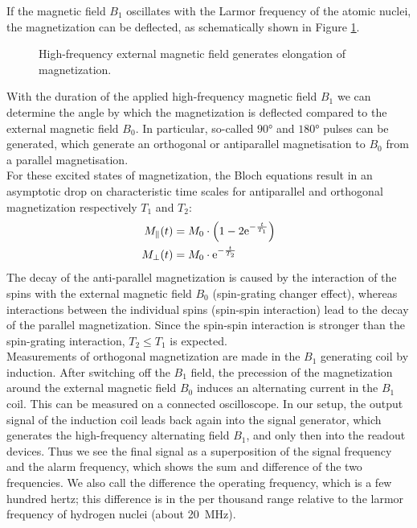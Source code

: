 If the magnetic field $B_1$ oscillates with the Larmor frequency of the atomic nuclei, the magnetization can be deflected, as schematically shown in Figure \ref{fig:magnet}.
\begin{figure}[ht]
\centering

\caption{High-frequency external magnetic field generates elongation of magnetization.}
\label{fig:magnet}
\end{figure}
With the duration of the applied high-frequency magnetic field $B_1$ we can determine the angle by which the magnetization is deflected compared to the external magnetic field $B_0$.
In particular, so-called $\ang{90}$ and $\ang{180}$ pulses can be generated, which generate an orthogonal or antiparallel magnetisation to $B_0$ from a parallel magnetisation.\\

For these excited states of magnetization, the Bloch equations result in an asymptotic drop on characteristic time scales for antiparallel and orthogonal magnetization respectively $T_1$ and $T_2$:
\begin{align}
M_\parallel(t)&=M_0\cdot\left(1-2\mathrm{e}^{-\frac{t}{T_1}}\right)\\
M_\bot(t)&=M_0\cdot\mathrm{e}^{-\frac{t}{T_2}}
\end{align}
The decay of the anti-parallel magnetization is caused by the interaction of the spins with the external magnetic field $B_0$ (spin-grating changer effect), whereas interactions between the individual spins (spin-spin interaction) lead to the decay of the parallel magnetization.
Since the spin-spin interaction is stronger than the spin-grating interaction, $T_2\leq T_1$ is expected.\\
Measurements of orthogonal magnetization are made in the $B_1$ generating coil by induction.
After switching off the $B_1$ field, the precession of the magnetization around the external magnetic field $B_0$ induces an alternating current in the $B_1$ coil.
This can be measured on a connected oscilloscope.
In our setup, the output signal of the induction coil leads back again into the signal generator, which generates the high-frequency alternating field $B_1$, and only then into the readout devices.
Thus we see the final signal as a superposition of the signal frequency and the alarm frequency, which shows the sum and difference of the two frequencies.
We also call the difference the operating frequency, which is a few hundred hertz; this difference is in the per thousand range relative to the larmor frequency of hydrogen nuclei (about \SI{20}{\mega\hertz}).\\

